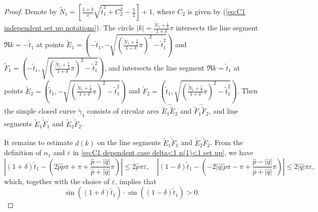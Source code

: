 \documentclass[11pt,reqno]{amsart}
\theoremstyle{definition}
\theoremstyle{remark}
\numberwithin{equation}{section}
\begin{document}
\begin{proof}
Denote by $\widetilde{N}_1=\left[\frac{1+\delta}{\pi}\sqrt{\tilde{t}_1^2+C_2^2}-\frac{1}{2}\right]+1$, where $C_2$ is given by (\ref{eq:C1 independent set up notations}). The circle $|k|=\frac{\widetilde{N}_1+\frac{1}{2}}{1+\delta}\pi$ intersects the line segment $\Re k=-\tilde{t}_1$ at points $\widetilde{E}_1=\left(-\tilde{t}_1,-\sqrt{\left(\frac{\widetilde{N}_1+\frac{1}{2}}{1+\delta}\pi\right)^2-\tilde{t}_1^2}\right)$ and $\widetilde{F}_1=\left(-\tilde{t}_1,\sqrt{\left(\frac{\widetilde{N}_1+\frac{1}{2}}{1+\delta}\pi\right)^2-\tilde{t}_1^2}\right)$, and intersects the line segment $\Re k=\tilde{t}_1$ at points $\widetilde{E}_2=\left(\tilde{t}_1,-\sqrt{\left(\frac{\widetilde{N}_1+\frac{1}{2}}{1+\delta}\pi\right)^2-\tilde{t}_1^2}\right)$ and $\widetilde{F}_2=\left(\tilde{t}_1,\sqrt{\left(\frac{\widetilde{N}_1+\frac{1}{2}}{1+\delta}\pi\right)^2-\tilde{t}_1^2}\right)$. Then the simple closed curve $\tilde{\gamma}_1$ consists of circular arcs $\stackrel{\frown}{\widetilde{E}_1\widetilde{E}_2}$ and $\stackrel{\frown}{\widetilde{F}_1\widetilde{F}_2}$, and line segments $\overline{\widetilde{E}_1\widetilde{F}_1}$ and $\overline{\widetilde{E}_2\widetilde{F}_2}$.
	
It remains to estimate $d(k)$ on the line segments $\overline{\widetilde{E}_1\widetilde{F}_1}$ and $\overline{\widetilde{E}_2\widetilde{F}_2}$.
From the definition of $\alpha_1$ and $\varepsilon$ in \eqref{eq:C1 dependent case delta<1 n(1)<1 set up}, we have
\begin{equation*}
\left|\left(1+\delta\right)\tilde{t}_1-\left(2\hat{p}\tilde{p}\pi+\pi+\frac{\hat{p}-|\hat{q}|}{\hat{p}+|\hat{q}|}\pi\right)\right|\leq 2\hat{p}\pi\varepsilon, \quad
\left|\left(1-\delta\right)\tilde{t}_1-\left(-2|\hat{q}|\tilde{p}\pi-\pi+\frac{\hat{p}-|\hat{q}|}{\hat{p}+|\hat{q}|}\pi\right)\right|\leq 2|\hat{q}|\pi\varepsilon,
\end{equation*}
which, together with the choice of $\varepsilon$, implies that
\begin{equation}\label{eq:estimation of 1delta}
\sin((1+\delta)\tilde{t}_1) \cdot \sin((1-\delta)\tilde{t}_1) > 0.
\end{equation}


\end{proof}
\end{document}
